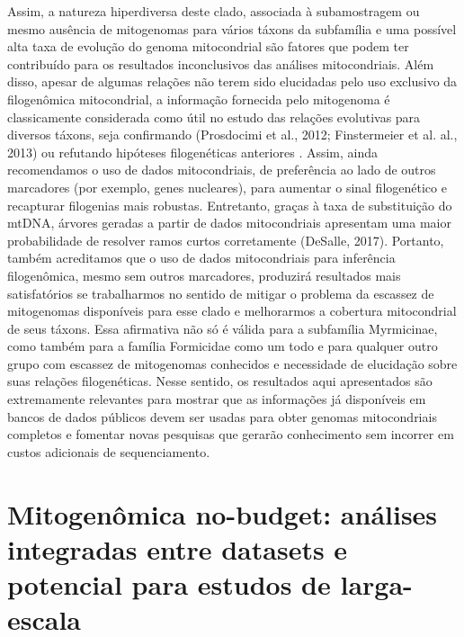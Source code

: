 \documentclass[../DISSERTACAO_MAIN.tex]{subfiles}
\begin{document}
	Assim, a natureza hiperdiversa deste clado, associada à subamostragem ou mesmo ausência de mitogenomas para vários táxons da subfamília e uma possível alta taxa de evolução do genoma mitocondrial são fatores que podem ter contribuído para os resultados inconclusivos das análises mitocondriais. Além disso, apesar de algumas relações não terem sido elucidadas pelo uso exclusivo da filogenômica mitocondrial, a informação fornecida pelo mitogenoma é classicamente considerada como útil no estudo das relações evolutivas para diversos táxons, seja confirmando (Prosdocimi et al., 2012; Finstermeier et al. al., 2013) ou refutando hipóteses filogenéticas anteriores \cite{Kayal2015, Uliano-Silva2016}. Assim, ainda recomendamos o uso de dados mitocondriais, de preferência ao lado de outros marcadores (por exemplo, genes nucleares), para aumentar o sinal filogenético e recapturar filogenias mais robustas. Entretanto, graças à taxa de substituição do mtDNA, árvores geradas a partir de dados mitocondriais apresentam uma maior probabilidade de resolver ramos curtos corretamente (DeSalle, 2017). Portanto, também acreditamos que o uso de dados mitocondriais para inferência filogenômica, mesmo sem outros marcadores, produzirá resultados mais satisfatórios se trabalharmos no sentido de mitigar o problema da escassez de mitogenomas disponíveis para esse clado e melhorarmos a cobertura mitocondrial de seus táxons. Essa afirmativa não só é válida para a subfamília Myrmicinae, como também para a família Formicidae como um todo e para qualquer outro grupo com escassez de mitogenomas conhecidos e necessidade de elucidação sobre suas relações filogenéticas. Nesse sentido, os resultados aqui apresentados são extremamente relevantes para mostrar que as informações já disponíveis em bancos de dados públicos devem ser usadas para obter genomas mitocondriais completos e fomentar novas pesquisas que gerarão conhecimento sem incorrer em custos adicionais de sequenciamento.
	
	\section{Mitogenômica no-budget: análises integradas entre datasets e potencial para estudos de larga-escala}
	
\end{document}
